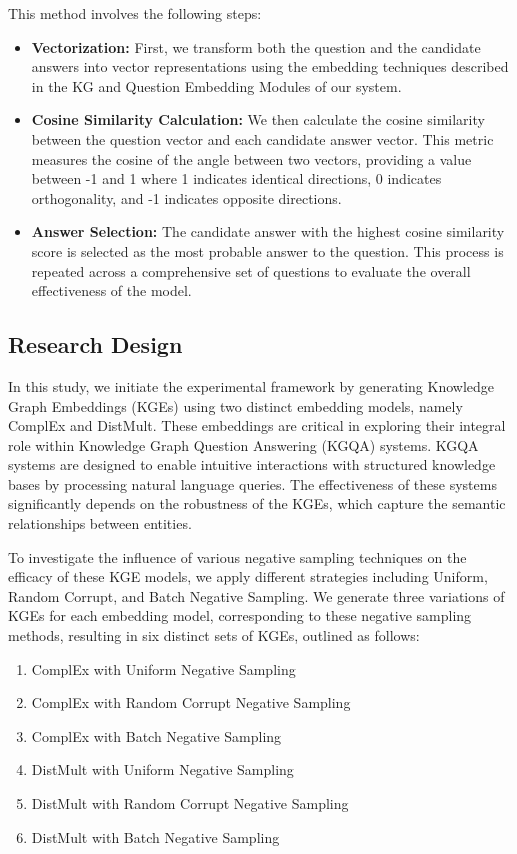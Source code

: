 \documentclass{article}
\begin{document}
This method involves the following steps:

\begin{itemize}
    \item \textbf{Vectorization:} First, we transform both the question and the candidate answers into vector representations using the embedding techniques described in the KG and Question Embedding Modules of our system.
    \item \textbf{Cosine Similarity Calculation:} We then calculate the cosine similarity between the question vector and each candidate answer vector. This metric measures the cosine of the angle between two vectors, providing a value between -1 and 1 where 1 indicates identical directions, 0 indicates orthogonality, and -1 indicates opposite directions.
    \item \textbf{Answer Selection:} The candidate answer with the highest cosine similarity score is selected as the most probable answer to the question. This process is repeated across a comprehensive set of questions to evaluate the overall effectiveness of the model.
\end{itemize}

\subsection{Research Design}

In this study, we initiate the experimental framework by generating Knowledge Graph Embeddings (KGEs) using two distinct embedding models, namely ComplEx and DistMult. These embeddings are critical in exploring their integral role within Knowledge Graph Question Answering (KGQA) systems. KGQA systems are designed to enable intuitive interactions with structured knowledge bases by processing natural language queries. The effectiveness of these systems significantly depends on the robustness of the KGEs, which capture the semantic relationships between entities.

To investigate the influence of various negative sampling techniques on the efficacy of these KGE models, we apply different strategies including Uniform, Random Corrupt, and Batch Negative Sampling. We generate three variations of KGEs for each embedding model, corresponding to these negative sampling methods, resulting in six distinct sets of KGEs, outlined as follows:

\begin{enumerate}
\item ComplEx with Uniform Negative Sampling
\item ComplEx with Random Corrupt Negative Sampling
\item ComplEx with Batch Negative Sampling
\item DistMult with Uniform Negative Sampling
\item DistMult with Random Corrupt Negative Sampling
\item DistMult with Batch Negative Sampling
\end{enumerate}
\end{document}
